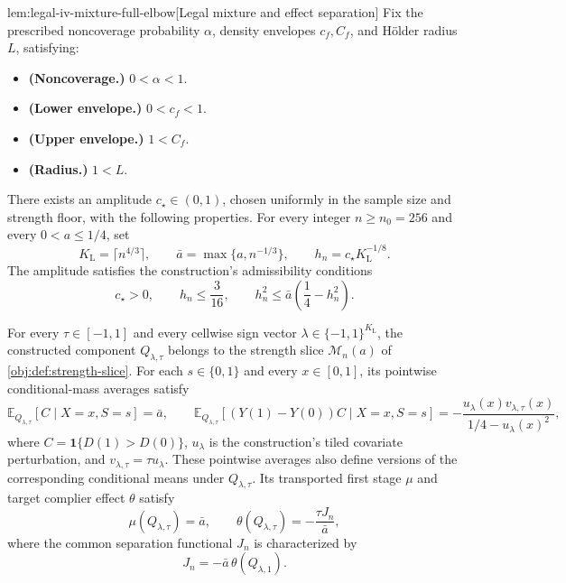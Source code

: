\documentclass[11pt]{article}
\begin{document}
\begin{lemmav}{lem:legal-iv-mixture-full-elbow}[Legal mixture and effect separation]
Fix the prescribed noncoverage probability \(\alpha\), density envelopes \(c_f,C_f\), and Hölder radius \(L\), satisfying:
\begin{itemize}
\item \textbf{(Noncoverage.)} \(0<\alpha<1\).
\item \textbf{(Lower envelope.)} \(0<c_f<1\).
\item \textbf{(Upper envelope.)} \(1<C_f\).
\item \textbf{(Radius.)} \(1<L\).
\end{itemize}
There exists an amplitude \(c_{\star}\in(0,1)\), chosen uniformly in the sample size and strength floor, with the following properties. For every integer \(n\ge n_0=256\) and every \(0<a\le1/4\), set
\[
K_{\mathrm L}=\lceil n^{4/3}\rceil,
\qquad
\bar a=\max\{a,n^{-1/3}\},
\qquad
h_n=c_{\star}K_{\mathrm L}^{-1/8}.
\]
The amplitude satisfies the construction's admissibility conditions
\[
c_{\star}>0,
\qquad
h_n\le\frac{3}{16},
\qquad
h_n^2\le\bar a\left(\frac14-h_n^2\right).
\]

For every \(\tau\in[-1,1]\) and every cellwise sign vector
\(\lambda\in\{-1,1\}^{K_{\mathrm L}}\), the constructed component
\(Q_{\lambda,\tau}\) belongs to the strength slice
\(\mathcal M_n(a)\) of \cref{obj:def:strength-slice}.
For each \(s\in\{0,1\}\) and every \(x\in[0,1]\), its pointwise conditional-mass averages satisfy
\[
\mathbb E_{Q_{\lambda,\tau}}[C\mid X=x,S=s]=\bar a,
\qquad
\mathbb E_{Q_{\lambda,\tau}}
 [(Y(1)-Y(0))C\mid X=x,S=s]
 =
 -\frac{u_{\lambda}(x)v_{\lambda,\tau}(x)}
 {1/4-u_{\lambda}(x)^2},
\]
where \(C=\mathbf 1\{D(1)>D(0)\}\), \(u_{\lambda}\) is the construction's tiled covariate perturbation, and \(v_{\lambda,\tau}=\tau u_{\lambda}\). These pointwise averages also define versions of the corresponding conditional means under \(Q_{\lambda,\tau}\). Its transported first stage \(\mu\) and target complier effect \(\theta\) satisfy
\[
\mu(Q_{\lambda,\tau})=\bar a,
\qquad
\theta(Q_{\lambda,\tau})=-\frac{\tau J_n}{\bar a},
\]
where the common separation functional \(J_n\) is characterized by
\[
J_n=-\bar a\,\theta(Q_{\lambda,1}).
\]


\end{lemmav}
\end{document}
